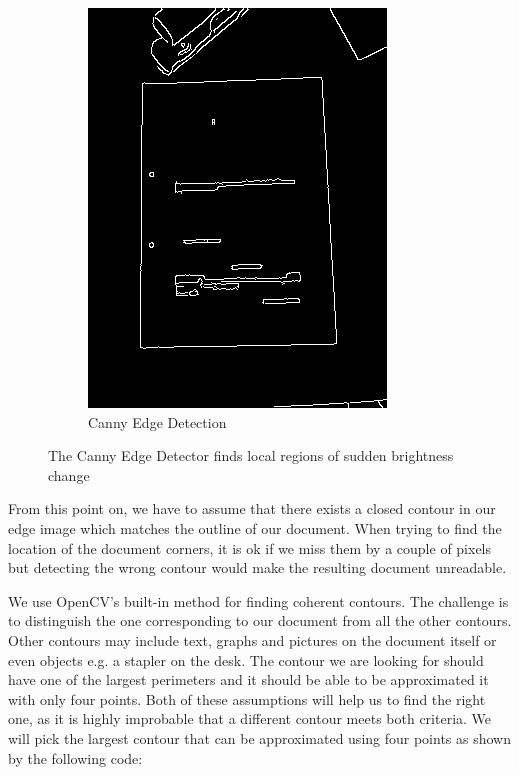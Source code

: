 \documentclass[bibliography=totoc]{scrartcl}
\begin{document}
\begin{figure}[ht!]
\begin{subfigure}[t]{0.28\linewidth}
		\includegraphics[width=\linewidth]{imgs/edges/cluttered_desk.jpg}
		\caption{Canny Edge Detection}
		\label{subfig:edges}
	\end{subfigure}
	\caption{The Canny Edge Detector finds local regions of sudden brightness change}
\end{figure}

From this point on, we have to assume that there exists a closed contour in our edge image which matches the outline of our document.
When trying to find the location of the document corners, it is ok if we miss them by a couple of pixels but detecting the wrong contour would make the resulting document unreadable.

We use OpenCV's built-in method for finding coherent contours.
The challenge is to distinguish the one corresponding to our document from all the other contours.
Other contours may include text, graphs and pictures on the document itself or even objects e.g. a stapler on the desk.
The contour we are looking for should have one of the largest perimeters and it should be able to be approximated it with only four points.
Both of these assumptions will help us to find the right one, as it is highly improbable that a different contour meets both criteria. 
We will pick the largest contour that can be approximated using four points as shown by the following code: \\
\end{document}
